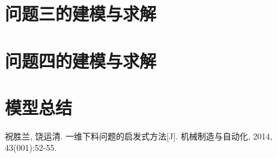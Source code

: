 \documentclass[withoutpreface,bwprint]{cumcmthesis} %
\begin{document}
\section{问题三的建模与求解}

\section{问题四的建模与求解}

\section{模型总结}

\begin{thebibliography}{9}%
    祝胜兰, 饶运清. 一维下料问题的启发式方法[J]. 机械制造与自动化, 2014, 43(001):52-55.
\end{thebibliography}

\begin{appendices}
\end{appendices}
\end{document}
